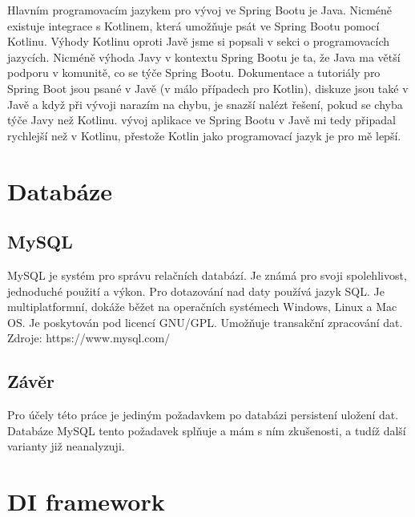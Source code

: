 Hlavním programovacím jazykem pro vývoj ve Spring Bootu je Java. Nicméně existuje integrace s Kotlinem, která umožňuje psát ve Spring Bootu pomocí Kotlinu. Výhody Kotlinu oproti Javě jsme si popsali v sekci o programovacích jazycích. Nicméně výhoda Javy v kontextu Spring Bootu je ta, že Java ma větší podporu v komunitě, co se týče Spring Bootu. Dokumentace a tutoriály pro Spring Boot jsou psané v Javě (v málo případech pro Kotlin), diskuze jsou také v Javě a když při vývoji narazím na chybu, je snazší nalézt řešení, pokud se chyba týče Javy než Kotlinu. vývoj aplikace ve Spring Bootu v Javě mi tedy připadal rychlejší než v Kotlinu, přestože Kotlin jako programovací jazyk je pro mě lepší.

\section{Databáze}

\subsection{MySQL}
MySQL je systém pro správu relačních databází. Je známá pro svoji spolehlivost, jednoduché použití a výkon. Pro dotazování nad daty používá jazyk SQL. Je multiplatformní, dokáže běžet na operačních systémech Windows, Linux a Mac OS. Je poskytován pod licencí GNU/GPL. Umožňuje transakční zpracování dat. Zdroje: https://www.mysql.com/

\subsection{Závěr}
Pro účely této práce je jediným požadavkem po databázi persistení uložení dat. Databáze MySQL tento požadavek splňuje a mám s ním zkušenosti, a tudíž další varianty již neanalyzuji.

\section{DI framework}

